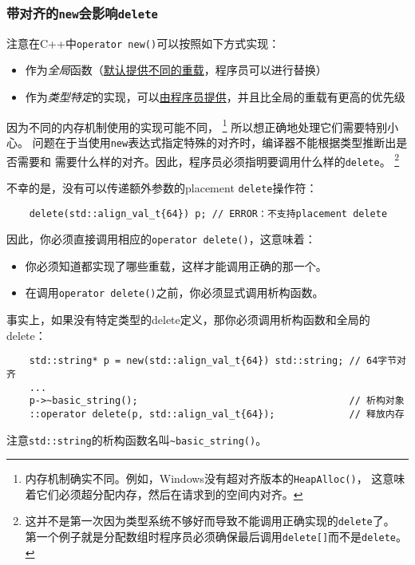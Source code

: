 \subsubsection{带对齐的\texttt{new}会影响\texttt{delete}}
注意在C++中\texttt{operator new()}可以按照如下方式实现：
\begin{itemize}
    \item 作为\emph{全局}函数（\hyperref[ch30.3]{默认提供不同的重载}，程序员可以进行替换）
    \item 作为\emph{类型特定}的实现，可以\hyperref[ch30.2]{由程序员提供}，并且比全局的重载有更高的优先级
\end{itemize}
因为不同的内存机制使用的实现可能不同，
\footnote{内存机制确实不同。例如，Windows没有超对齐版本的\texttt{HeapAlloc()}，
这意味着它们必须超分配内存，然后在请求到的空间内对齐。}
所以想正确地处理它们需要特别小心。
问题在于当使用\texttt{new}表达式指定特殊的对齐时，编译器不能根据类型推断出是否需要和
需要什么样的对齐。因此，程序员必须指明要调用什么样的\texttt{delete}。
\footnote{这并不是第一次因为类型系统不够好而导致不能调用正确实现的\texttt{delete}了。
第一个例子就是分配数组时程序员必须确保最后调用\texttt{delete[]}而不是\texttt{delete}。}

不幸的是，没有可以传递额外参数的placement \texttt{delete}操作符：
\begin{lstlisting}
    delete(std::align_val_t{64}) p; // ERROR：不支持placement delete
\end{lstlisting}
因此，你必须直接调用相应的\texttt{operator delete()}，这意味着：
\begin{itemize}
    \item 你必须知道都实现了哪些重载，这样才能调用正确的那一个。
    \item 在调用\texttt{operator delete()}之前，你必须显式调用析构函数。
\end{itemize}
事实上，如果没有特定类型的delete定义，那你必须调用析构函数和全局的delete：
\begin{lstlisting}
    std::string* p = new(std::align_val_t{64}) std::string; // 64字节对齐
    ...
    p->~basic_string();                                     // 析构对象
    ::operator delete(p, std::align_val_t{64});             // 释放内存
\end{lstlisting}
注意\texttt{std::string}的析构函数名叫\texttt{\textasciitilde basic\_string()}。

